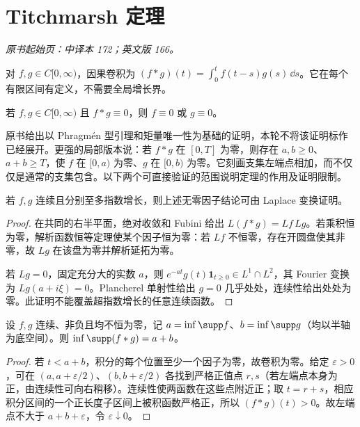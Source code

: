 \section{Titchmarsh 定理}\label{sec:yosida-06-05}
\noindent\textit{原书起始页：中译本 172；英文版 166。}

对 $f,g\in C[0,\infty)$，因果卷积为 $(f*g)(t)=\int_0^tf(t-s)g(s)\,\dd s$。它在每个有限区间有定义，不需要全局增长界。

\begin{theorem}\label{thm:y6-titchmarsh}
若 $f,g\in C[0,\infty)$ 且 $f*g\equiv0$，则 $f\equiv0$ 或 $g\equiv0$。
\end{theorem}

原书给出以 Phragm\'en 型引理和矩量唯一性为基础的证明，本轮不将该证明标作已经展开。更强的局部版本说：若 $f*g$ 在 $[0,T]$ 为零，则存在 $a,b\ge0$、$a+b\ge T$，使 $f$ 在 $[0,a)$ 为零、$g$ 在 $[0,b)$ 为零。它刻画支集左端点相加，而不仅仅是通常的支集包含。以下两个可直接验证的范围说明定理的作用及证明限制。

\begin{proposition}[指数增长情形的无零因子证明]
若 $f,g$ 连续且分别至多指数增长，则上述无零因子结论可由 Laplace 变换证明。
\end{proposition}
\begin{proof}
在共同的右半平面，绝对收敛和 Fubini 给出 $L(f*g)=Lf\,Lg$。若乘积恒为零，解析函数恒等定理使某个因子恒为零：若 $Lf$ 不恒零，存在开圆盘使其非零，故 $Lg$ 在该盘为零并解析延拓为零。

若 $Lg=0$，固定充分大的实数 $a$，则 $e^{-at}g(t)\mathbf1_{t\ge0}\in L^1\cap L^2$，其 Fourier 变换为 $Lg(a+i\xi)=0$。Plancherel 单射性给出 $g=0$ 几乎处处，连续性给出处处为零。此证明不能覆盖超指数增长的任意连续函数。
\end{proof}

\begin{proposition}[非负函数的左端点]
设 $f,g$ 连续、非负且均不恒为零，记 $a=\inf\supp f$、$b=\inf\supp g$（均以半轴为底空间）。则 $\inf\supp(f*g)=a+b$。
\end{proposition}
\begin{proof}
若 $t<a+b$，积分的每个位置至少一个因子为零，故卷积为零。给定 $\varepsilon>0$，可在 $(a,a+\varepsilon/2)$、$(b,b+\varepsilon/2)$ 各找到严格正值点 $r,s$（若左端点本身为正，由连续性可向右稍移）。连续性使两函数在这些点附近正；取 $t=r+s$，相应积分区间的一个正长度子区间上被积函数严格正，所以 $(f*g)(t)>0$。故左端点不大于 $a+b+\varepsilon$，令 $\varepsilon\downarrow0$。
\end{proof}

